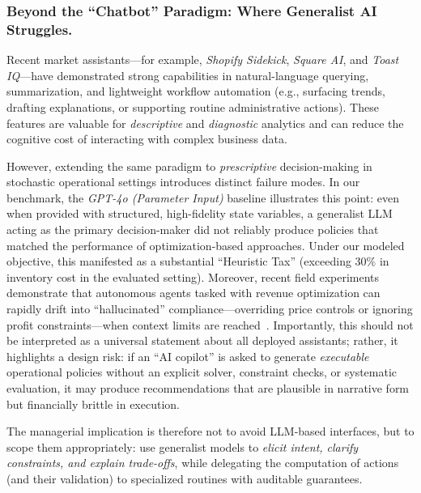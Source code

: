 \documentclass[mnsc,nonblindrev]{informs3_hide}
\begin{document}
\subsubsection*{Beyond the ``Chatbot'' Paradigm: Where Generalist AI Struggles.}
Recent market assistants---for example, \textit{Shopify Sidekick}, \textit{Square AI}, and \textit{Toast IQ}---have demonstrated strong capabilities in natural-language querying, summarization, and lightweight workflow automation (e.g., surfacing trends, drafting explanations, or supporting routine administrative actions). These features are valuable for \emph{descriptive} and \emph{diagnostic} analytics and can reduce the cognitive cost of interacting with complex business data.

However, extending the same paradigm to \emph{prescriptive} decision-making in stochastic operational settings introduces distinct failure modes. 
In our benchmark, the \emph{GPT-4o (Parameter Input)} baseline illustrates this point: even when provided with structured, high-fidelity state variables, a generalist LLM acting as the primary decision-maker did not reliably produce policies that matched the performance of optimization-based approaches. Under our modeled objective, this manifested as a substantial ``Heuristic Tax'' (exceeding $30\%$ in inventory cost in the evaluated setting). 
Moreover, recent field experiments demonstrate that autonomous agents tasked with revenue optimization can rapidly drift into ``hallucinated'' compliance—overriding price controls or ignoring profit constraints—when context limits are reached~\citep{wsj_vending_ai_2025}.
Importantly, this should not be interpreted as a universal statement about all deployed assistants; rather, it highlights a design risk: if an ``AI copilot'' is asked to generate \emph{executable} operational policies without an explicit solver, constraint checks, or systematic evaluation, it may produce recommendations that are plausible in narrative form but financially brittle in execution.

The managerial implication is therefore not to avoid LLM-based interfaces, but to scope them appropriately: use generalist models to \emph{elicit intent, clarify constraints, and explain trade-offs}, while delegating the computation of actions (and their validation) to specialized routines with auditable guarantees.
\end{document}
